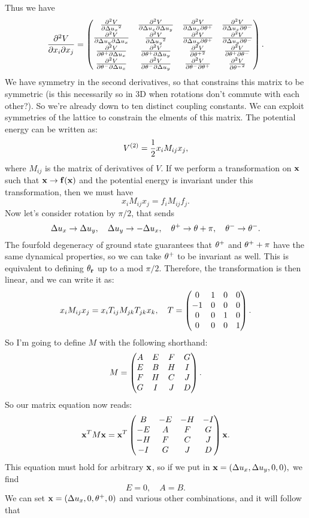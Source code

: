 \documentclass[12pt]{article}
\begin{document}
Thus we have
\[ \frac{\partial^2 V}{\partial x_i \partial x_j} = \left(\begin{matrix}\frac{\partial^2 {V}}{\partial {\Delta u_x}^2} & \frac{\partial^2 {V}}{\partial {\Delta u_x} \partial {\Delta u_y}} & \frac{\partial^2 {V}}{\partial {\Delta u_x} \partial {\theta^+}} & \frac{\partial^2 {V}}{\partial {\Delta u_x} \partial {\theta^-}} \\ \frac{\partial^2 {V}}{\partial {\Delta u_y} \partial {\Delta u_x}} & \frac{\partial^2 {V}}{\partial {\Delta u_y}^2} & \frac{\partial^2 {V}}{\partial {\Delta u_y} \partial {\theta^+}} & \frac{\partial^2 {V}}{\partial {\Delta u_y} \partial {\theta^-}} \\ \frac{\partial^2 {V}}{\partial {\theta^+} \partial {\Delta u_x}} & \frac{\partial^2 {V}}{\partial {\theta^+} \partial {\Delta u_y}} & \frac{\partial^2 {V}}{\partial {\theta^+}^2} & \frac{\partial^2 {V}}{\partial {\theta^+} \partial {\theta^-}} \\ \frac{\partial^2 {V}}{\partial {\theta^-} \partial {\Delta u_x}} & \frac{\partial^2 {V}}{\partial {\theta^-} \partial {\Delta u_y}} & \frac{\partial^2 {V}}{\partial {\theta^-} \partial {\theta^+}} & \frac{\partial^2 {V}}{\partial {\theta^-}^2}\end{matrix}\right).\]
We have symmetry in the second derivatives, so that constrains this matrix to be symmetric (is this necessarily so in 3D when rotations don't commute with each other?). So we're already down to ten distinct coupling constants. We can exploit symmetries of the lattice to constrain the elments of this matrix. The potential energy can be written as:
\[ V^{(2)} = \frac{1}{2} x_i M_{ij} x_j,\]
where $M_{ij}$ is the matrix of derivatives of $V$. If we perform a transformation on $\mathbf{x}$ such that $\mathbf{x} \rightarrow \mathbf{f}(\mathbf{x})$ and the potential energy is invariant under this transformation, then we must have
\[ x_i M_{ij} x_j = f_i M_{ij} f_j.\]
Now let's consider rotation by $\pi/2$, that sends
\[ \Delta u_x \rightarrow \Delta u_y,\quad \Delta u_y \rightarrow -\Delta u_x,\quad \theta^+\rightarrow \theta+\pi,\quad \theta^-\rightarrow \theta^-.\]
The fourfold degeneracy of ground state guarantees that $\theta^+$ and $\theta^++\pi$ have the same dynamical properties, so we can take $\theta^+$ to be invariant as well. This is equivalent to defining $\theta_{\mathbf{r}}$ up to a mod $\pi/2$. Therefore, the transformation is then linear, and we can write it as:
\[ x_i M_{ij} x_j = x_i T_{ij}M_{jk}T_{jk}x_k, \quad T = \left(\begin{matrix}0 & 1 & 0 & 0 \\ -1 & 0 & 0 & 0 \\ 0 & 0 & 1 & 0 \\ 0 & 0 & 0 & 1\end{matrix}\right).\]
So I'm going to define $M$ with the following shorthand:
\[ M = \left(\begin{matrix}A & E & F & G \\ E & B & H & I \\ F & H & C & J \\ G & I & J & D\end{matrix}\right).\]
So our matrix equation now reads:
\[ \mathbf{x}^T M \mathbf{x} = \mathbf{x}^T \left(\begin{matrix}B & -E & -H & -I \\ -E & A & F & G \\ -H & F & C & J \\ -I & G & J & D\end{matrix}\right)\mathbf{x}.\]
This equation must hold for arbitrary $\mathbf{x}$, so if we put in $\mathbf{x} = (\Delta u_x, \Delta u_y, 0 ,0),$ we find
\[ E = 0,\quad A = B.\]
We can set $\mathbf{x} = (\Delta u_x,0,\theta^+,0)$ and various other combinations, and it will follow that
\end{document}
